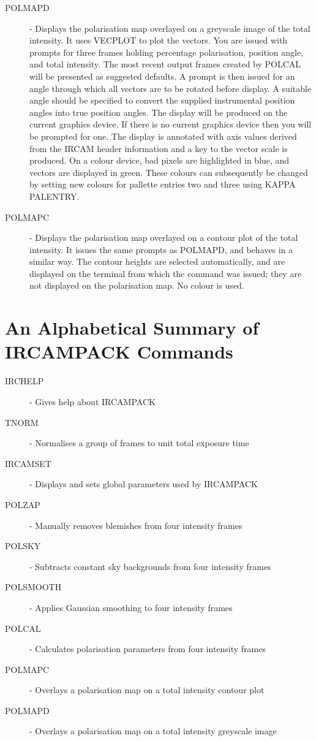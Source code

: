 \begin{description}
\item [POLMAPD] - Displays the polarisation map overlayed on a
greyscale image of the total intensity. It uses {\small VECPLOT} to
plot the vectors.  You are issued with prompts for three frames holding
percentage polarisation, position angle, and total intensity. The most
recent output frames created by {\small POLCAL} will be presented as
suggested defaults. A prompt is then issued for an angle through which
all vectors are to be rotated before display. A suitable angle should
be specified to convert the supplied instrumental position angles into
true position angles. The display will be produced on the current
graphics device. If there is no current graphics device then you will
be prompted for one. The display is annotated with axis values derived
from the {\small IRCAM} header information and a key to the vector
scale is produced. On a colour device, bad pixels are highlighted in
blue, and vectors are displayed in green. These colours can
subsequently be changed by setting new colours for pallette entries two
and three using {\small KAPPA PALENTRY}.

\item [POLMAPC] - Displays the polarisation map overlayed on a contour
plot of the total intensity. It issues the same prompts as {\small
POLMAPD}, and behaves in a similar way. The contour heights are
selected automatically, and are displayed on the terminal from which
the command was issued; they are not displayed on the polarisation map.
No colour is used.

\end{description}

\appendix
\newpage

\section{An Alphabetical Summary of IRCAMPACK Commands}

\begin{description}
\item [IRCHELP] - Gives help about {\small IRCAMPACK}
\item [TNORM] - Normalises a group of frames to unit total exposure time
\item [IRCAMSET] - Displays and sets global parameters used by {\small 
IRCAMPACK}
\item [POLZAP] - Manually removes blemishes from four intensity frames
\item [POLSKY] - Subtracts constant sky backgrounds from four intensity frames
\item [POLSMOOTH] - Applies Gaussian smoothing to four intensity frames
\item [POLCAL] - Calculates polarisation parameters from four intensity frames
\item [POLMAPC] - Overlays a polarisation map on a total intensity contour plot
\item [POLMAPD] - Overlays a polarisation map on a total intensity greyscale 
image
\end{description}

